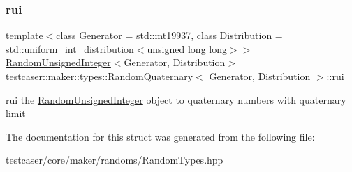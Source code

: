 \subsubsection{\texorpdfstring{rui}{rui}}
{\footnotesize\ttfamily template$<$class Generator = std\+::mt19937, class Distribution = std\+::uniform\+\_\+int\+\_\+distribution$<$unsigned long long$>$$>$ \\
\mbox{\hyperlink{classtestcaser_1_1maker_1_1types_1_1RandomUnsignedInteger}{Random\+Unsigned\+Integer}}$<$Generator, Distribution$>$ \mbox{\hyperlink{structtestcaser_1_1maker_1_1types_1_1RandomQuaternary}{testcaser\+::maker\+::types\+::\+Random\+Quaternary}}$<$ Generator, Distribution $>$\+::rui}



rui the \mbox{\hyperlink{classtestcaser_1_1maker_1_1types_1_1RandomUnsignedInteger}{Random\+Unsigned\+Integer}} object to quaternary numbers with quaternary limit 



The documentation for this struct was generated from the following file\+:\begin{DoxyCompactItemize}
\item 
testcaser/core/maker/randoms/Random\+Types.\+hpp\end{DoxyCompactItemize}
